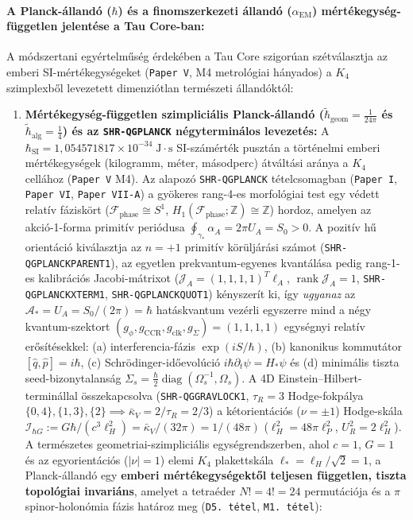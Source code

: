 \documentclass[11pt,a4paper]{article}
\begin{document}
\paragraph{A Planck-állandó ($\hbar$) és a finomszerkezeti állandó ($\alpha_{\mathrm{EM}}$) mértékegység-független jelentése a Tau Core-ban:}
A módszertani egyértelműség érdekében a Tau Core szigorúan szétválasztja az emberi SI-mértékegységeket (\texttt{Paper V}, M4 metrológiai hányados) a $K_4$ szimplexből levezetett dimenziótlan természeti állandóktól:
\begin{enumerate}[label=(\roman*),leftmargin=1.8em,itemsep=2pt]
\item \textbf{Mértékegység-független szimpliciális Planck-állandó ($\tilde{\hbar}_{\mathrm{geom}} = \frac{1}{24\pi}$ és $\tilde{\hbar}_{\mathrm{alg}} = \frac{1}{4}$) és az \texttt{SHR-QGPLANCK} négyterminálos levezetés:} A $\hbar_{\mathrm{SI}} = 1{,}054571817\times 10^{-34}\;\mathrm{J\cdot s}$ SI-számérték pusztán a történelmi emberi mértékegységek (kilogramm, méter, másodperc) átváltási aránya a $K_4$ cellához (\texttt{Paper V} M4). Az alapozó \texttt{SHR-QGPLANCK} tételcsomagban (\texttt{Paper I}, \texttt{Paper VI}, \texttt{Paper VII-A}) a gyökeres rang-4-es morfológiai test egy védett relatív fáziskört ($\mathcal{F}_{\mathrm{phase}}\cong S^1$, $H_1(\mathcal{F}_{\mathrm{phase}};\mathbb{Z})\cong\mathbb{Z}$) hordoz, amelyen az akció-1-forma primitív periódusa $\oint_{\gamma_*}\alpha_A = 2\pi U_A = S_0 > 0$. A pozitív hű orientáció kiválasztja az $n=+1$ primitív körüljárási számot (\texttt{SHR-QGPLANCKPARENT1}), az egyetlen prekvantum-egyenes kvantálása pedig rang-1-es kalibrációs Jacobi-mátrixot ($\mathcal{J}_A=(1,1,1,1)^T\ell_A$, $\operatorname{rank}\mathcal{J}_A=1$, \texttt{SHR-QGPLANCKXTERM1}, \texttt{SHR-QGPLANCKQUOT1}) kényszerít ki, így \emph{ugyanaz} az $\mathcal{A}_*=U_A=S_0/(2\pi)=\hbar$ hatáskvantum vezérli egyszerre mind a négy kvantum-szektort $(g_\phi,g_{\mathrm{CCR}},g_{\mathrm{clk}},g_\Sigma)=(1,1,1,1)$ egységnyi relatív erősítésekkel: (a) interferencia-fázis $\exp(iS/\hbar)$, (b) kanonikus kommutátor $[\hat{q},\hat{p}]=i\hbar$, (c) Schr\"odinger-időevolúció $i\hbar\partial_t\psi=H_*\psi$ és (d) minimális tiszta seed-bizonytalanság $\Sigma_s=\frac{\hbar}{2}\operatorname{diag}(\Omega_s^{-1},\Omega_s)$. A 4D Einstein--Hilbert-terminállal összekapcsolva (\texttt{SHR-QGGRAVLOCK1}, $\tau_R=3$ Hodge-fokpálya $\{0,4\},\{1,3\},\{2\}\implies\bar{\kappa}_V=2/\tau_R=2/3$) a kétorientációs ($\nu=\pm 1$) Hodge-skála $\mathcal{I}_{\hbar G}:=G\hbar/(c^3\ell_H^2)=\bar{\kappa}_V/(32\pi)=1/(48\pi)$ ($\ell_H^2=48\pi\ell_P^2$, $U_R^2=2\ell_H^2$). A természetes geometriai-szimpliciális egységrendszerben, ahol $c = 1$, $G = 1$ és az egyorientációs ($|\nu|=1$) elemi $K_4$ plakettskála $\ell_* = \ell_H/\sqrt{2} = 1$, a Planck-állandó egy \textbf{emberi mértékegységektől teljesen független, tiszta topológiai invariáns}, amelyet a tetraéder $N! = 4! = 24$ permutációja és a $\pi$ spinor-holonómia fázis határoz meg (\texttt{D5.\ tétel}, \texttt{M1.\ tétel}):

\end{enumerate}
\end{document}
